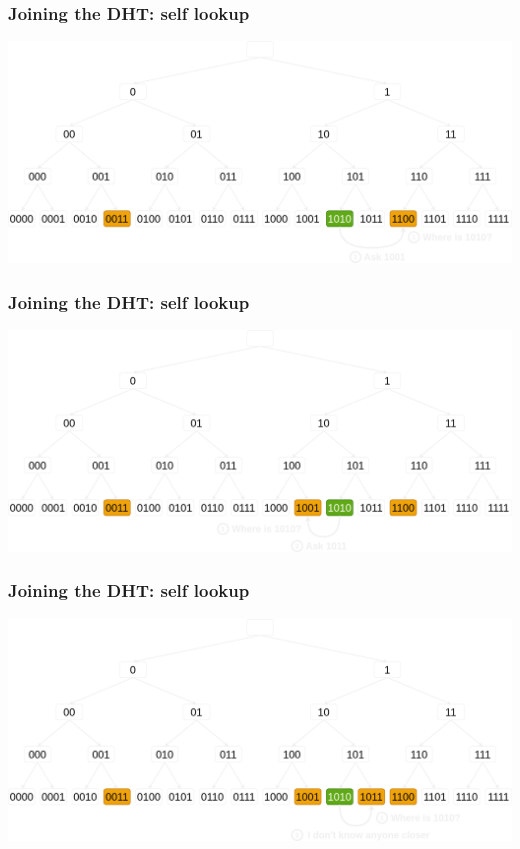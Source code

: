 \documentclass{pl-slide}
\begin{document}
\begin{frame}
\frametitle{Joining the DHT: self lookup}
\begin{minipage}[b]{\linewidth}
\begin{center}
        \includegraphics[width=\linewidth,keepaspectratio]{resources//dht-self-lookup2.png}
\end{center}
\end{minipage}
\end{frame}

\begin{frame}
\frametitle{Joining the DHT: self lookup}
\begin{minipage}[b]{\linewidth}
\begin{center}
        \includegraphics[width=\linewidth,keepaspectratio]{resources//dht-self-lookup3.png}
\end{center}
\end{minipage}
\end{frame}

\begin{frame}
\frametitle{Joining the DHT: self lookup}
\begin{minipage}[b]{\linewidth}
\begin{center}
        \includegraphics[width=\linewidth,keepaspectratio]{resources//dht-self-lookup4.png}
\end{center}
\end{minipage}
\end{frame}
\end{document}
